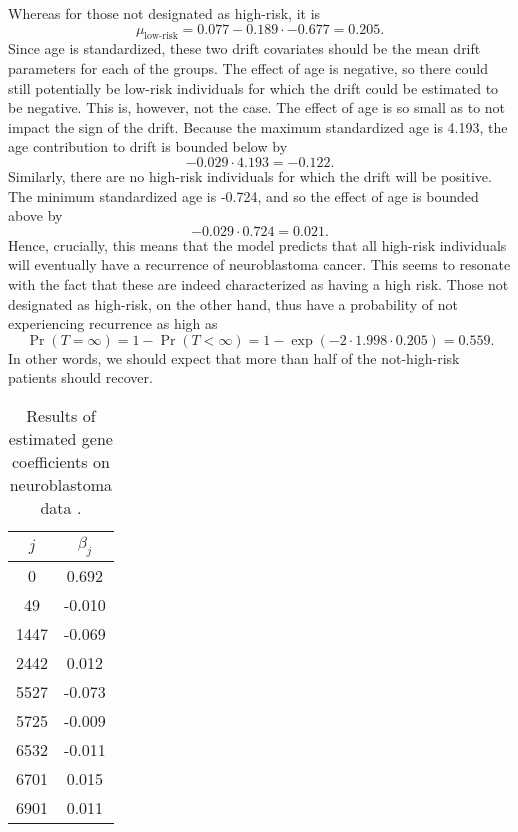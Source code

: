 Whereas for those not designated as high-risk, it is
\begin{equation}
    \mu_{\text{low-risk}}=0.077-0.189\cdot-0.677=0.205.
\end{equation}
Since age is standardized, these two drift covariates should be the mean drift parameters for each of the groups.
The effect of age is negative, so there could still potentially be low-risk individuals for which the drift could be estimated to be negative.
This is, however, not the case.
The effect of age is so small as to not impact the sign of the drift.
Because the maximum standardized age is 4.193, the age contribution to drift is bounded below by 
\begin{equation*}
    -0.029\cdot4.193=-0.122.
\end{equation*}
Similarly, there are no high-risk individuals for which the drift will be positive.
The minimum standardized age is -0.724, and so the effect of age is bounded above by
\begin{equation*}
    -0.029\cdot0.724=0.021.
\end{equation*}
Hence, crucially, this means that the model predicts that all high-risk individuals will eventually have a recurrence of neuroblastoma cancer.
This seems to resonate with the fact that these are indeed characterized as having a high risk.
Those not designated as high-risk, on the other hand, thus have a probability of not experiencing recurrence as high as
\begin{equation*}
    \Pr{(T=\infty)}=1-\Pr{(T<\infty)}=1-\exp{(-2\cdot 1.998\cdot 0.205)}=0.559.
\end{equation*}
In other words, we should expect that more than half of the not-high-risk patients should recover.


\begin{table}
\caption{Results of estimated gene coefficients on neuroblastoma data \citep{oberthuer-data}.}
\label{tab:oberthuer-beta}
\centering
\begin{tabular}{cc}
\toprule
$j$ & $\beta_j$ \\
\hline
0 & 0.692 \\
49 & -0.010 \\
1447 & -0.069 \\
2442 & 0.012 \\
5527 & -0.073 \\
5725 & -0.009 \\
6532 & -0.011 \\
6701 & 0.015 \\
6901 & 0.011 \\
\bottomrule
\end{tabular}
\end{table}

